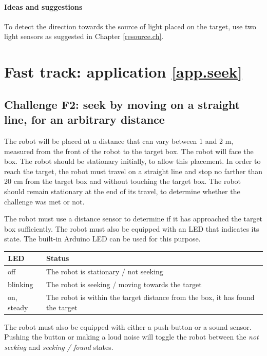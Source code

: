 \documentclass[12pt]{book}
\begin{document}
\paragraph{Ideas and suggestions}

\begin{compactenum}[1)]
  \item To detect the direction towards the source of light placed on
    the target, use two light sensors as suggested in Chapter
    \ref{resource.ch}. 
\end{compactenum}


\section{Fast track: application \ref{app.seek}}

\subsection{Challenge F2: seek by moving on a straight line, for an arbitrary distance}

The robot will be placed at a distance that can
vary between 1 and 2 m, measured from the front of the robot to the
target box. The robot will face the box. The robot should be stationary
initially, to allow this placement. In order to reach the target, the
robot must travel on a straight line and stop no farther than 20 cm
from the target box and without touching the target box. The robot
should remain stationary at the end of its travel, to determine whether
the challenge was met or not.

The robot must use a distance sensor to determine if it has approached the target box sufficiently. The robot must also be equipped with an LED that indicates its state. The built-in Arduino LED can be used for this purpose. 

\smallskip
\begin{tabular}{l p{8cm}}
  \toprule
  LED & Status \\
  \midrule
  off & The robot is stationary / not seeking \\
  blinking & The robot is seeking / moving towards the target \\
  on, steady & The robot is within the target distance from the box, it has found the target \\
  \bottomrule
\end{tabular}
\smallskip

The robot must also be equipped with either a push-button or a sound sensor. Pushing the button or making a loud noise will toggle the robot between the \emph{not seeking} and  \emph{seeking / found} states.
\end{document}
